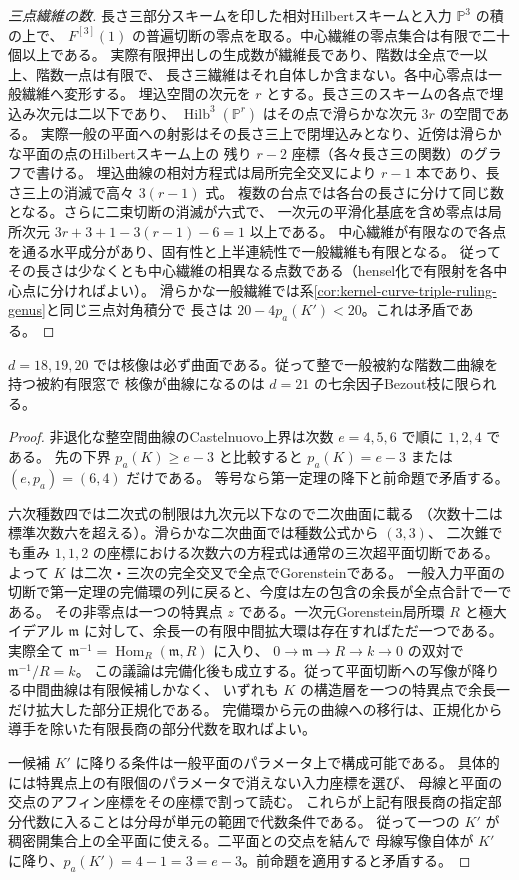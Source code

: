 \begin{proof}[三点繊維の数]
長さ三部分スキームを印した相対Hilbertスキームと入力 $\mathbb P^3$ の積の上で、
$F^{[3]}(1)$ の普遍切断の零点を取る。中心繊維の零点集合は有限で二十個以上である。
実際有限押出しの生成数が繊維長であり、階数は全点で一以上、階数一点は有限で、
長さ三繊維はそれ自体しか含まない。各中心零点は一般繊維へ変形する。
埋込空間の次元を $r$ とする。長さ三のスキームの各点で埋込み次元は二以下であり、
$\operatorname{Hilb}^3(\mathbb P^r)$ はその点で滑らかな次元 $3r$ の空間である。
実際一般の平面への射影はその長さ三上で閉埋込みとなり、近傍は滑らかな平面の点のHilbertスキーム上の
残り $r-2$ 座標（各々長さ三の関数）のグラフで書ける。
埋込曲線の相対方程式は局所完全交叉により $r-1$ 本であり、長さ三上の消滅で高々 $3(r-1)$ 式。
複数の台点では各台の長さに分けて同じ数となる。さらに二束切断の消滅が六式で、
一次元の平滑化基底を含め零点は局所次元 $3r+3+1-3(r-1)-6=1$ 以上である。
中心繊維が有限なので各点を通る水平成分があり、固有性と上半連続性で一般繊維も有限となる。
従ってその長さは少なくとも中心繊維の相異なる点数である（hensel化で有限射を各中心点に分ければよい）。
滑らかな一般繊維では系\ref{cor:kernel-curve-triple-ruling-genus}と同じ三点対角積分で
長さは $20-4p_a(K')<20$。これは矛盾である。
\end{proof}

\begin{theorem}\label{thm:cofactor-curve-kernel-only-bezout}
$d=18,19,20$ では核像は必ず曲面である。従って整で一般被約な階数二曲線を持つ被約有限窓で
核像が曲線になるのは $d=21$ の七余因子Bezout枝に限られる。
\end{theorem}
\begin{proof}
非退化な整空間曲線のCastelnuovo上界は次数 $e=4,5,6$ で順に $1,2,4$ である。
先の下界 $p_a(K)\ge e-3$ と比較すると $p_a(K)=e-3$ または $(e,p_a)=(6,4)$ だけである。
等号なら第一定理の降下と前命題で矛盾する。

六次種数四では二次式の制限は九次元以下なので二次曲面に載る
（次数十二は標準次数六を超える）。滑らかな二次曲面では種数公式から $(3,3)$、
二次錐でも重み $1,1,2$ の座標における次数六の方程式は通常の三次超平面切断である。
よって $K$ は二次・三次の完全交叉で全点でGorensteinである。
一般入力平面の切断で第一定理の完備環の列に戻ると、今度は左の包含の余長が全点合計で一である。
その非零点は一つの特異点 $z$ である。一次元Gorenstein局所環 $R$ と極大イデアル
$\mathfrak m$ に対して、余長一の有限中間拡大環は存在すればただ一つである。
実際全て $\mathfrak m^{-1}=\operatorname{Hom}_R(\mathfrak m,R)$ に入り、
$0\to\mathfrak m\to R\to k\to0$ の双対で $\mathfrak m^{-1}/R=k$。
この議論は完備化後も成立する。従って平面切断への写像が降りる中間曲線は有限候補しかなく、
いずれも $K$ の構造層を一つの特異点で余長一だけ拡大した部分正規化である。
完備環から元の曲線への移行は、正規化から導手を除いた有限長商の部分代数を取ればよい。

一候補 $K'$ に降りる条件は一般平面のパラメータ上で構成可能である。
具体的には特異点上の有限個のパラメータで消えない入力座標を選び、
母線と平面の交点のアフィン座標をその座標で割って読む。
これらが上記有限長商の指定部分代数に入ることは分母が単元の範囲で代数条件である。
従って一つの $K'$ が稠密開集合上の全平面に使える。二平面との交点を結んで
母線写像自体が $K'$ に降り、$p_a(K')=4-1=3=e-3$。前命題を適用すると矛盾する。
\end{proof}
